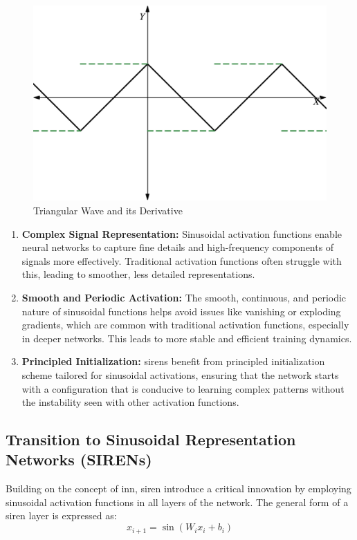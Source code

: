     \begin{figure}[H]
        \centering
        \includegraphics[height=0.25\textheight]{assets/triangular-wave.png}
        \caption{Triangular Wave and its Derivative}
        \label{fig:triangular wave}
    \end{figure}
    
    
    \begin{enumerate}[label=\textbf{\roman*.}]
        \item \textbf{Complex Signal Representation:} Sinusoidal activation functions enable neural networks to capture fine details and high-frequency components of signals more effectively. Traditional activation functions often struggle with this, leading to smoother, less detailed representations.
        \item \textbf{Smooth and Periodic Activation:} The smooth, continuous, and periodic nature of sinusoidal functions helps avoid issues like vanishing or exploding gradients, which are common with traditional activation functions, especially in deeper networks. This leads to more stable and efficient training dynamics.
        \item \textbf{Principled Initialization:} \gls{siren}s benefit from principled initialization scheme tailored for sinusoidal activations, ensuring that the network starts with a configuration that is conducive to learning complex patterns without the instability seen with other activation functions.
    \end{enumerate}
    
    \subsection{Transition to Sinusoidal Representation Networks (SIRENs)}
    Building on the concept of \gls{inn}, \gls{siren} introduce a critical innovation by employing sinusoidal activation functions in all layers of the network. The general form of a \gls{siren} layer is expressed as:
    \begin{equation}
        x_{i+1} = \sin(W_i x_i + b_i)
    \end{equation}
    
